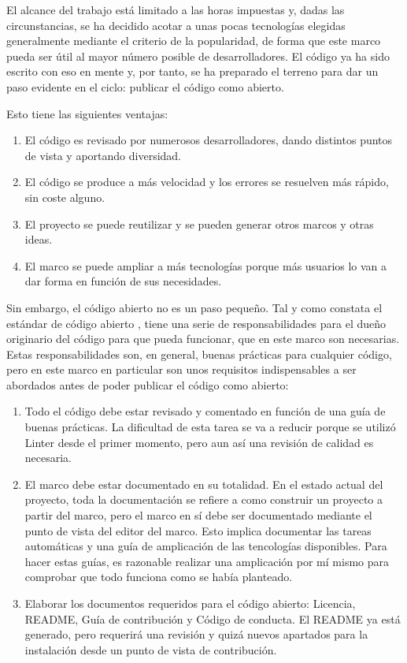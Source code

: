 El alcance del trabajo está limitado a las horas impuestas y, dadas las circunstancias, se ha decidido acotar a unas pocas tecnologías elegidas generalmente mediante el criterio de la popularidad, de forma que este marco pueda ser útil al mayor número posible de desarrolladores. El código ya ha sido escrito con eso en mente y, por tanto, se ha preparado el terreno para dar un paso evidente en el ciclo: publicar el código como abierto.

Esto tiene las siguientes ventajas:
\begin{enumerate}
  \item El código es revisado por numerosos desarrolladores, dando distintos puntos de vista y aportando diversidad.
  \item El código se produce a más velocidad y los errores se resuelven más rápido, sin coste alguno.
  \item El proyecto se puede reutilizar y se pueden generar otros marcos y otras ideas.
  \item El marco se puede ampliar a más tecnologías porque más usuarios lo van a dar forma en función de sus necesidades.
\end{enumerate}

Sin embargo, el código abierto no es un paso pequeño. Tal y como constata el estándar de código abierto \cite{OPENSRC}, tiene una serie de responsabilidades para el dueño originario del código para que pueda funcionar, que en este marco son necesarias. Estas responsabilidades son, en general, buenas prácticas para cualquier código, pero en este marco en particular son unos requisitos indispensables a ser abordados antes de poder publicar el código como abierto:
\begin{enumerate}
  \item Todo el código debe estar revisado y comentado en función de una guía de buenas prácticas. La dificultad de esta tarea se va a reducir porque se utilizó Linter desde el primer momento, pero aun así una revisión de calidad es necesaria.
  \item El marco debe estar documentado en su totalidad. En el estado actual del proyecto, toda la documentación se refiere a como construir un proyecto a partir del marco, pero el marco en sí debe ser documentado mediante el punto de vista del editor del marco. Esto implica documentar las tareas automáticas y una guía de amplicación de las tencologías disponibles. Para hacer estas guías, es razonable realizar una amplicación por mí mismo para comprobar que todo funciona como se había planteado.
  \item Elaborar los documentos requeridos para el código abierto: Licencia, README, Guía de contribución y Código de conducta. El README ya está generado, pero requerirá una revisión y quizá nuevos apartados para la instalación desde un punto de vista de contribución.
\end{enumerate}

